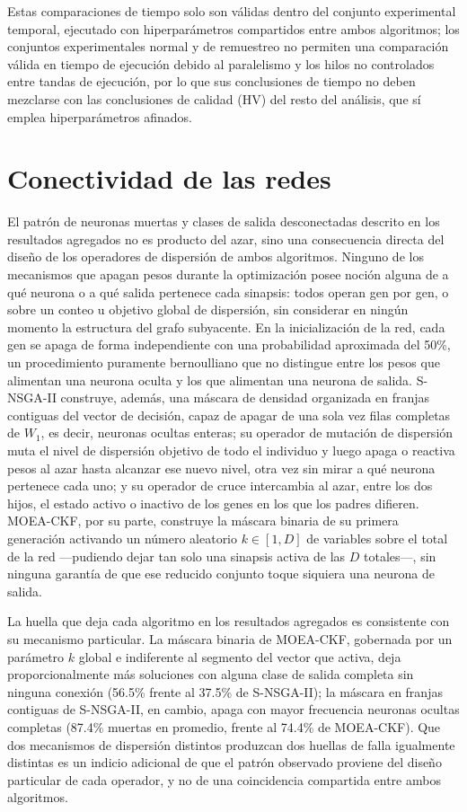 Estas comparaciones de tiempo solo son válidas dentro del conjunto experimental temporal, ejecutado con hiperparámetros compartidos entre ambos algoritmos; los conjuntos experimentales normal y de remuestreo no permiten una comparación válida en tiempo de ejecución debido al paralelismo y los hilos no controlados entre tandas de ejecución, por lo que sus conclusiones de tiempo no deben mezclarse con las conclusiones de calidad (HV) del resto del análisis, que sí emplea hiperparámetros afinados.

\section{Conectividad de las redes}
\label{sec:discusion-conectividad}

El patrón de neuronas muertas y clases de salida desconectadas descrito en los resultados agregados no es producto del azar, sino una consecuencia directa del diseño de los operadores de dispersión de ambos algoritmos. Ninguno de los mecanismos que apagan pesos durante la optimización posee noción alguna de a qué neurona o a qué salida pertenece cada sinapsis: todos operan gen por gen, o sobre un conteo u objetivo global de dispersión, sin considerar en ningún momento la estructura del grafo subyacente. En la inicialización de la red, cada gen se apaga de forma independiente con una probabilidad aproximada del 50\%, un procedimiento puramente bernoulliano que no distingue entre los pesos que alimentan una neurona oculta y los que alimentan una neurona de salida. S-NSGA-II construye, además, una máscara de densidad organizada en franjas contiguas del vector de decisión, capaz de apagar de una sola vez filas completas de $W_1$, es decir, neuronas ocultas enteras; su operador de mutación de dispersión muta el nivel de dispersión objetivo de todo el individuo y luego apaga o reactiva pesos al azar hasta alcanzar ese nuevo nivel, otra vez sin mirar a qué neurona pertenece cada uno; y su operador de cruce intercambia al azar, entre los dos hijos, el estado activo o inactivo de los genes en los que los padres difieren. MOEA-CKF, por su parte, construye la máscara binaria de su primera generación activando un número aleatorio $k \in [1, D]$ de variables sobre el total de la red —pudiendo dejar tan solo una sinapsis activa de las $D$ totales—, sin ninguna garantía de que ese reducido conjunto toque siquiera una neurona de salida.

La huella que deja cada algoritmo en los resultados agregados es consistente con su mecanismo particular. La máscara binaria de MOEA-CKF, gobernada por un parámetro $k$ global e indiferente al segmento del vector que activa, deja proporcionalmente más soluciones con alguna clase de salida completa sin ninguna conexión (56.5\% frente al 37.5\% de S-NSGA-II); la máscara en franjas contiguas de S-NSGA-II, en cambio, apaga con mayor frecuencia neuronas ocultas completas (87.4\% muertas en promedio, frente al 74.4\% de MOEA-CKF). Que dos mecanismos de dispersión distintos produzcan dos huellas de falla igualmente distintas es un indicio adicional de que el patrón observado proviene del diseño particular de cada operador, y no de una coincidencia compartida entre ambos algoritmos.

